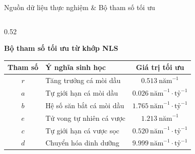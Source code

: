 \documentclass[aspectratio=169, 10pt]{beamer}
\begin{document}
\begin{frame}{Nguồn dữ liệu thực nghiệm \& Bộ tham số tối ưu}
\begin{columns}[c]
    \begin{column}{0.52\textwidth}
      \begin{block}{\textbf{Bộ tham số tối ưu từ khớp NLS}}
        \centering
        \footnotesize
        \renewcommand{\arraystretch}{1.12}
        \begin{tabular}{c l c}
          \toprule
          \textbf{Tham số} & \textbf{Ý nghĩa sinh học} & \textbf{Giá trị tối ưu} \\
          \midrule
          $r$ & Tăng trưởng cá mòi dầu & $\mathbf{0.513}\ \text{năm}^{-1}$ \\
          $a$ & Tự giới hạn cá mòi dầu & $\mathbf{0.026}\ \text{năm}^{-1}\cdot\text{tỷ}^{-1}$ \\
          $b$ & Hệ số săn bắt cá mòi dầu & $\mathbf{1.765}\ \text{năm}^{-1}\cdot\text{tỷ}^{-1}$ \\
          $e$ & Tử vong tự nhiên cá vược & $\mathbf{1.213}\ \text{năm}^{-1}$ \\
          $c$ & Tự giới hạn cá vược sọc & $\mathbf{0.520}\ \text{năm}^{-1}\cdot\text{tỷ}^{-1}$ \\
          $d$ & Chuyển hóa dinh dưỡng & $\mathbf{9.999}\ \text{năm}^{-1}\cdot\text{tỷ}^{-1}$ \\
          \bottomrule
        \end{tabular}
      \end{block}
    \end{column}
  \end{columns}
\end{frame}
\end{document}
